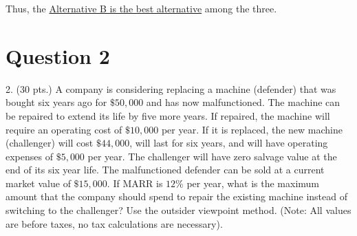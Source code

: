 \documentclass[12pt]{article}
\begin{document}
Thus, the \underline{Alternative B is the best alternative} among the three.


\newpage
\section*{Question 2}
\begin{q}
2. (30 pts.) A company is considering replacing a machine (defender) that was bought six years ago for \(\$ 50,000\) and has now malfunctioned. The machine can be repaired to extend its life by five more years. If repaired, the machine will require an operating cost of \(\$ 10,000\) per year. If it is replaced, the new machine (challenger) will cost \(\$ 44,000\), will last for six years, and will have operating expenses of \(\$ 5,000\) per year. The challenger will have zero salvage value at the end of its six year life. The malfunctioned defender can be sold at a current market value of \(\$ 15,000\). If MARR is \(12 \%\) per year, what is the maximum amount that the company should spend to repair the existing machine instead of switching to the challenger? Use the outsider viewpoint method. (Note: All values are before taxes, no tax calculations are necessary).
\end{q}
\end{document}
